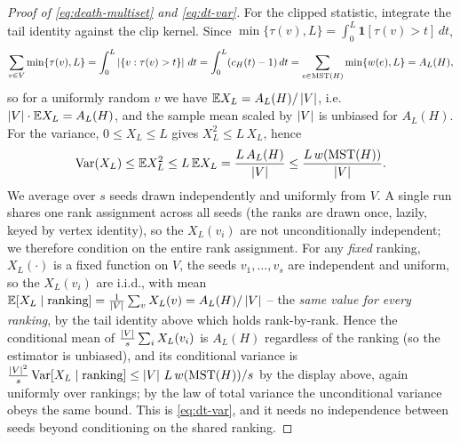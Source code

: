 \begin{proof}[Proof of \eqref{eq:death-multiset} and \eqref{eq:dt-var}]
For the clipped statistic, integrate the tail identity against the clip kernel. Since $\min\{\tau(v),L\}
=\int_0^L\mathbf 1[\tau(v)>t]\,dt$,
\[
  \sum_{v\in V}\min\{\tau(v),L\}=\int_0^L\left|\{v:\tau(v)>t\}\right|\,dt=\int_0^L(c_H(t)-1)\,dt
    =\sum_{e\in\mathrm{MST}(H)}\min\{w(e),L\}=A_L(H),
\]
so for a uniformly random $v$ we have $\mathbb{E} X_L=A_L(H)/\left|V\right|$, i.e.\ $\left|V\right|\cdot\mathbb{E} X_L=A_L(H)$, and the
sample mean scaled by $\left|V\right|$ is unbiased for $A_L(H)$. For the variance, $0\le X_L\le L$ gives
$X_L^2\le L\,X_L$, hence
\[
  \operatorname{Var}(X_L)\le\mathbb{E} X_L^2\le L\,\mathbb{E} X_L=\frac{L\,A_L(H)}{\left|V\right|}\le\frac{L\,w(\mathrm{MST}(H))}{\left|V\right|}.
\]
We average over $s$ seeds drawn independently and uniformly from $V$. A single run shares one rank
assignment across all seeds (the ranks are drawn once, lazily, keyed by vertex identity), so the
$X_L(v_i)$ are not unconditionally independent; we therefore condition on the entire rank assignment. For
any \emph{fixed} ranking, $X_L(\cdot)$ is a fixed function on $V$, the seeds $v_1,\dots,v_s$ are
independent and uniform, so the $X_L(v_i)$ are i.i.d., with mean $\mathbb{E}[X_L\mid\text{ranking}]=\tfrac1{\left|V\right|}
\sum_{v}X_L(v)=A_L(H)/\left|V\right|$ -- the \emph{same value for every ranking}, by the tail identity above which
holds rank-by-rank. Hence the conditional mean of $\tfrac{\left|V\right|}{s}\sum_i X_L(v_i)$ is $A_L(H)$
regardless of the ranking (so the estimator is unbiased), and its conditional variance is
$\tfrac{\left|V\right|^2}{s}\operatorname{Var}[X_L\mid\text{ranking}]\le\left|V\right|\,L\,w(\mathrm{MST}(H))/s$ by the display above, again
uniformly over rankings; by the law of total variance the unconditional variance obeys the same bound.
This is \eqref{eq:dt-var}, and it needs no independence between seeds beyond conditioning on the shared
ranking.
\end{proof}

